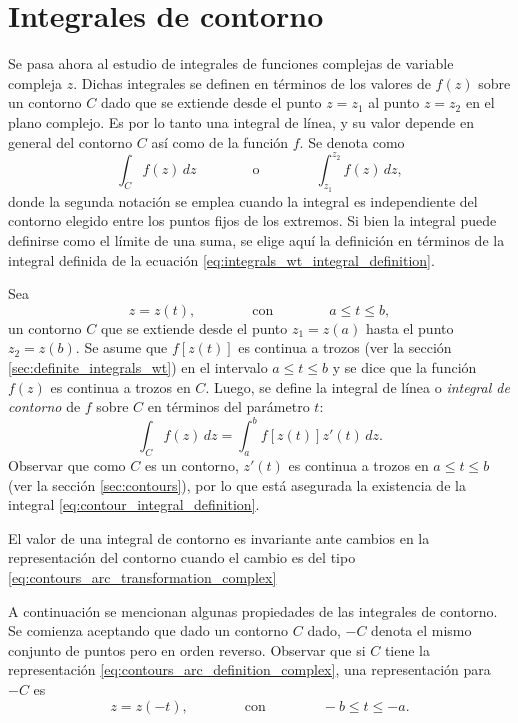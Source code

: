 \documentclass[a4paper]{report}
\begin{document}
\section{Integrales de contorno}\label{sec:contour_integrals}

Se pasa ahora al estudio de integrales de funciones complejas de variable compleja \(z\). Dichas integrales se definen en términos de los valores de \(f(z)\) sobre un contorno \(C\) dado que se extiende desde el punto \(z=z_1\) al punto \(z=z_2\) en el plano complejo. Es por lo tanto una integral de línea, y su valor depende en general del contorno \(C\) así como de la función \(f\). Se denota como
\[
 \int_{C}f(z)\,dz
 \qquad\qquad\textrm{o}\qquad\qquad
 \int_{z_1}^{z_2}f(z)\,dz,
\]
donde la segunda notación se emplea cuando la integral es independiente del contorno elegido entre los puntos fijos de los extremos. Si bien la integral puede definirse como el límite de una suma, se elige aquí la definición en términos de la integral definida de la ecuación \ref{eq:integrals_wt_integral_definition}.

Sea
\[
 z=z(t),\qquad\qquad\textrm{con}\qquad\qquad a\leq t\leq b, 
\]
un contorno \(C\) que se extiende desde el punto \(z_1=z(a)\) hasta el punto \(z_2=z(b)\). Se asume que \(f[z(t)]\) es continua a trozos (ver la sección \ref{sec:definite_integrals_wt}) en el intervalo \(a\leq t\leq b\) y se dice que la función \(f(z)\) es continua a trozos en \(C\). Luego, se define la integral de línea o \emph{integral de contorno} de \(f\) sobre \(C\) en términos del parámetro \(t\):
\begin{equation}\label{eq:contour_integral_definition}
 \int_C f(z)\,dz=\int_a^b f[z(t)]z'(t)\,dz.
\end{equation}
Observar que como \(C\) es un contorno, \(z'(t)\) es continua a trozos en \(a\leq t\leq b\) (ver la sección \ref{sec:contours}), por lo que está asegurada la existencia de la integral \ref{eq:contour_integral_definition}. 

El valor de una integral de contorno es invariante ante cambios en la representación del contorno cuando el cambio es del tipo \ref{eq:contours_arc_transformation_complex}

A continuación se mencionan algunas propiedades de las integrales de contorno. Se comienza aceptando que dado un contorno \(C\) dado, \(-C\) denota el mismo conjunto de puntos pero en orden reverso. Observar que si \(C\) tiene la representación \ref{eq:contours_arc_definition_complex}, una representación para \(-C\) es
\begin{equation}\label{eq:contours_reverse_contour}
 z=z(-t),\qquad\qquad\textrm{con}\qquad\qquad -b\leq t\leq-a. 
\end{equation}
\end{document}
